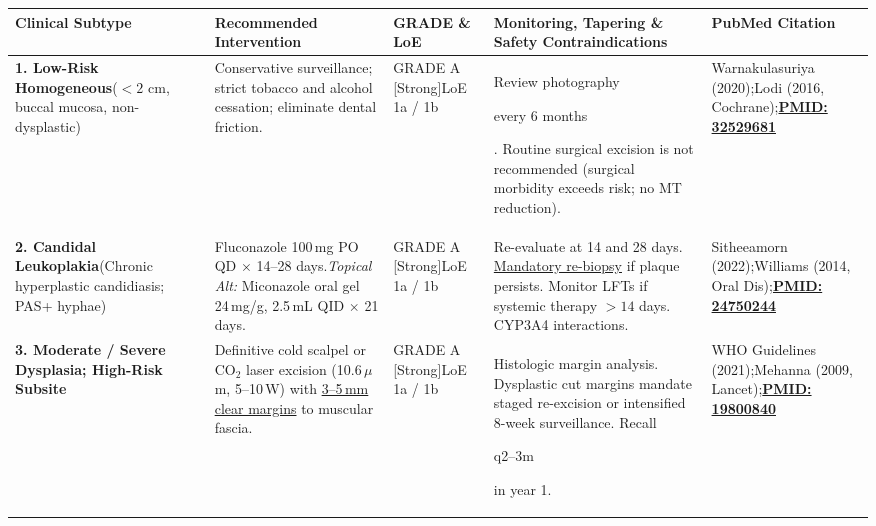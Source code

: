 \documentclass[9pt,a4paper]{article}
\newcommand{\hlg}[1]{\colorbox{hlgray}{\strut #1}}
\begin{document}
\footnotesize
\setlength{\tabcolsep}{3.5pt}
\renewcommand{\arraystretch}{1.10}
\begin{tabularx}{\linewidth}{>{\raggedright\arraybackslash}p{2.8cm} >{\raggedright\arraybackslash}p{3.8cm} >{\raggedright\arraybackslash}p{2.0cm} >{\raggedright\arraybackslash}p{5.1cm} >{\raggedright\arraybackslash}X}
\toprule
\textbf{Clinical Subtype} & \textbf{Recommended Intervention} & \textbf{GRADE \& LoE} & \textbf{Monitoring, Tapering \& Safety Contraindications} & \textbf{PubMed Citation} \\
\midrule
\textbf{1. Low-Risk Homogeneous}\newline\scriptsize ($<2\text{ cm}$, buccal mucosa, non-dysplastic) &
Conservative surveillance; strict tobacco and alcohol cessation; eliminate dental friction. &
GRADE A [Strong]\newline LoE 1a / 1b &
Review photography \hlg{every 6 months}. Routine surgical excision is not recommended (surgical morbidity exceeds risk; no MT reduction). &
Warnakulasuriya (2020);\newline Lodi (2016, Cochrane);\newline \href{https://pubmed.ncbi.nlm.nih.gov/32529681/}{\textbf{PMID: 32529681}} \\
\midrule
\textbf{2. Candidal Leukoplakia}\newline\scriptsize (Chronic hyperplastic candidiasis; PAS+ hyphae) &
Fluconazole 100\,mg PO QD $\times$ 14--28 days.\newline\textit{Topical Alt:} Miconazole oral gel 24\,mg/g, 2.5\,mL QID $\times$ 21 days. &
GRADE A [Strong]\newline LoE 1a / 1b &
Re-evaluate at 14 and 28 days. \underline{Mandatory re-biopsy} if plaque persists. Monitor LFTs if systemic therapy $>14$ days. CYP3A4 interactions. &
Sitheeamorn (2022);\newline Williams (2014, Oral Dis);\newline \href{https://pubmed.ncbi.nlm.nih.gov/24750244/}{\textbf{PMID: 24750244}} \\
\midrule
\textbf{3. Moderate / Severe Dysplasia; High-Risk Subsite} &
Definitive cold scalpel or $\text{CO}_2$ laser excision (10.6\,$\mu$m, 5--10\,W) with \underline{3--5\,mm clear margins} to muscular fascia. &
GRADE A [Strong]\newline LoE 1a / 1b &
Histologic margin analysis. Dysplastic cut margins mandate staged re-excision or intensified 8-week surveillance. Recall \hlg{q2--3m} in year 1. &
WHO Guidelines (2021);\newline Mehanna (2009, Lancet);\newline \href{https://pubmed.ncbi.nlm.nih.gov/19800840/}{\textbf{PMID: 19800840}} \\

\end{tabularx}
\end{document}
